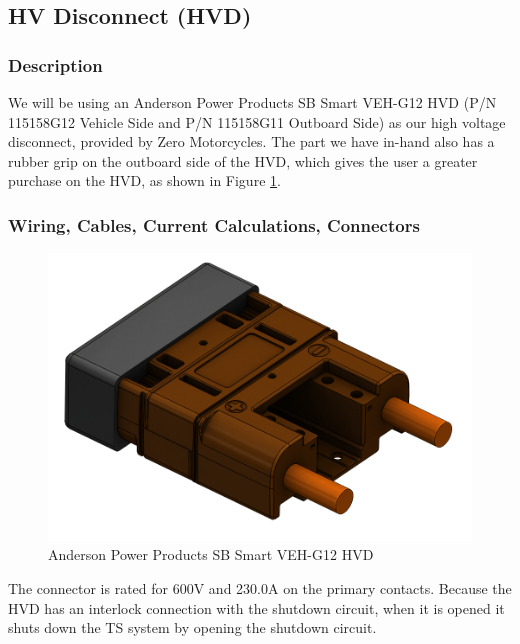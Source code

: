\documentclass{article}
\begin{document}
    \subsection{HV Disconnect (HVD)} \label{hvdsection}

        \subsubsection{Description}

            We will be using an Anderson Power Products SB Smart VEH-G12 HVD (P/N 115158G12 Vehicle Side and P/N 115158G11 Outboard Side) as our high voltage disconnect, provided by Zero Motorcycles. The part we have in-hand also has a rubber grip on the outboard side of the HVD, which gives the user a greater purchase on the HVD, as shown in Figure \ref{HVDoneside}.

        \subsubsection{Wiring, Cables, Current Calculations, Connectors}

            \begin{figure}[H]
                \centering
                \includegraphics[width = 0.25 \textwidth]{anderson_hvd_interlock}
                \caption{Anderson Power Products SB Smart VEH-G12 HVD}
                \label{HVDoneside}
            \end{figure}
            
            
            The connector is rated for 600V and 230.0A on the primary contacts. Because the HVD has an interlock connection with the shutdown circuit, when it is opened it shuts down the TS system by opening the shutdown circuit.
            
\end{document}
